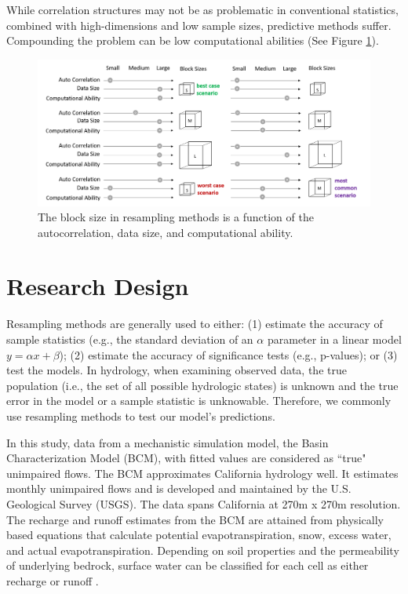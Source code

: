 While correlation structures may not be as problematic in conventional statistics, combined with high-dimensions and low sample sizes, predictive methods suffer. Compounding the problem can be low computational abilities (See Figure \ref{fig:blocksizes}).

\begin{figure}
	\centering
	\includegraphics[width=15cm,trim={0 0 0 0},clip=true]{plots/blocksizes.png}
	\caption{The block size in resampling methods is a function of the autocorrelation, data size, and computational ability.} 
	\label{fig:blocksizes}
\end{figure}

\section{Research Design} \label{ch5:design}
Resampling methods are generally used to either: (1) estimate the accuracy of sample statistics (e.g., the standard deviation of an $\alpha$ parameter in a linear model $y=\alpha x+\beta$); (2) estimate the accuracy of significance tests (e.g., p-values); or (3) test the models. In hydrology, when examining observed data, the true population (i.e., the set of all possible hydrologic states) is unknown and the true error in the model or a sample statistic is unknowable. Therefore, we commonly use resampling methods to test our model's predictions. 

In this study, data from a mechanistic simulation model, the Basin Characterization Model (BCM), with fitted values are considered as ``true" unimpaired flows. The BCM approximates California hydrology well. It estimates monthly unimpaired flows and is developed and maintained by the U.S. Geological Survey (USGS). The data spans California at 270m x 270m resolution. The recharge and runoff estimates from the BCM are attained from physically based equations that calculate potential evapotranspiration, snow, excess water, and actual evapotranspiration. Depending on soil properties and the permeability of underlying bedrock, surface water can be classified for each cell as either recharge or runoff \cite{flint2014california}. 

